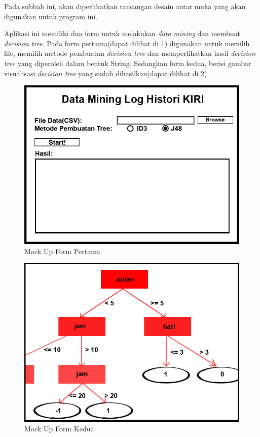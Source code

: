 Pada subbab ini, akan diperlihatkan rancangan desain antar muka yang akan digunakan untuk program ini.

Aplikasi ini memiliki dua form untuk melakukan \textsl{data mining} dan membuat \textsl{decision tree}. Pada form pertama(dapat dilihat di \ref{fig:MU1}) digunakan untuk memilih file, memilih metode pembuatan \textsl{decision tree} dan memperlihatkan hasil \textsl{decision tree} yang diperoleh dalam bentuk String. Sedangkan form kedua, berisi gambar visualisasi \textsl{decision tree} yang sudah dihasilkan(dapat dilihat di \ref{fig:MU2}).
\begin{figure}[H]
\centering
\includegraphics[scale=1.2]{Gambar/mockUp1.jpg}
\caption[Mock Up Form Pertama]{Mock Up Form Pertama} 
\label{fig:MU1}
\end{figure}

\begin{figure}[H]
\centering
\includegraphics[scale=1.2]{Gambar/mockUp2.jpg}
\caption[Mock Up Form Kedua]{Mock Up Form Kedua} 
\label{fig:MU2}
\end{figure}
